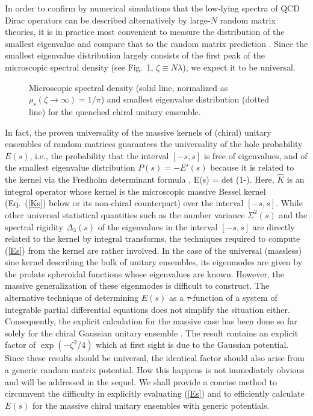 In order to confirm by numerical simulations that the low-lying
spectra of QCD Dirac operators can be described alternatively by
large-$N$ random matrix theories, it is in practice most convenient to
measure the distribution of the smallest eigenvalue \cite{BBMSVW} and
compare that to the random matrix prediction \cite{F,WGW}.  Since the
smallest eigenvalue distribution
largely consists of the first peak of the microscopic spectral density 
(see Fig.~1, $\zeta\equiv N \lambda$), we expect it to be universal. 
\begin{figure}
\epsfxsize=180pt
  \begin{center}
    \leavevmode
{}    
  \end{center}
\caption{
Microscopic spectral density (solid line,
normalized as $\rho_s(\zeta\!\to\!\infty)\!=\!1/\pi$)
and smallest eigenvalue distribution (dotted line)
for the quenched chiral unitary ensemble.
}
\end{figure}
\noindent
In fact, the proven universality of the massive kernels
\cite{DN1,DN2} of (chiral) unitary ensembles of random matrices 
guarantees the universality of the hole
probability $E(s)$, i.e., the probability that the interval $[-s,s]$
is free of eigenvalues, and of the smallest eigenvalue distribution
$P(s)=-E'(s)$ 
because it is related to 
the kernel via the Fredholm determinant formula
\cite{Meh},
\beq
E(s)
= {\rm det} (1-).
\label{Es}
\eeq
Here, $\hat{K}$ is an integral operator whose kernel is the 
microscopic massive Bessel kernel (Eq.~(\ref{Ks}) below
or its non-chiral counterpart) over the interval $[-s,s]$.
While other universal statistical quantities such as
the number variance $\Sigma^2(s)$
and the spectral rigidity ${\Delta}_3(s)$
of the eigenvalues in the interval $[-s,s]$
are directly related to the kernel by integral
transforms, the techniques
required to compute (\ref{Es}) from the kernel are rather involved.
In the case of the universal (massless) sine kernel describing 
the bulk of unitary ensembles, its eigenmodes are given by
the prolate spheroidal functions whose eigenvalues are known.
However, the massive generalization of these eigenmodes is 
difficult to construct.
The alternative technique of determining $E(s)$ as a  
$\tau$-function of a system of integrable
partial differential equations
\cite{TW1} does not simplify the situation either.
Consequently, the explicit calculation 
for the massive case has been done 
so far solely for the chiral Gaussian 
unitary ensemble \cite{WGW}.
The result contains an explicit factor of 
$\exp(-\zeta^2/4)$ which at first sight is due to the Gaussian potential.  
Since these results should be universal, 
the identical factor should also arise from a generic random
matrix potential.  How this happens is not immediately obvious and
will be addressed in the sequel.
We shall provide a concise method 
to circumvent the difficulty in explicitly evaluating (\ref{Es}) 
and to efficiently calculate $E(s)$
for the massive chiral unitary ensembles with generic potentials.

